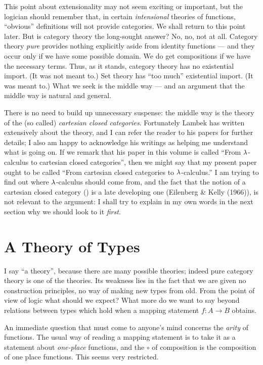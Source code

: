 This point about extensionality may not seem exciting or important, but the logician
should remember that, in certain {\it intensional} theories of functions, ``obvious''
definitions will not provide categories. We shall return to this point later. But is
category theory the long-sought answer? No, no, not at all. Category theory {\it pure}
provides nothing explicitly aside from identity functions --- and they occur only if we
have some possible domain. We do get compositions if we have the necessary terms. Thus, as
it stands, category theory has no existential import. (It was not meant to.) Set theory
has ``too much'' existential import. (It was meant to.) What we seek is the middle way ---
and an argument that the middle way is natural and general.

There is no need to build up unnecessary suspense: the middle way is the theory of the (so
called) {\it cartesian closed categories}. Fortunately Lambek has written extensively
about the theory, and I can refer the reader to his papers for further details; I also am
happy to acknowledge his writings as helping me understand what is going on. If we remark
that his paper in this volume is called ``From $\lambda$-calculus to cartesian closed
categories'', then we might say that my present paper ought to be called ``From cartesian
closed categories to $\lambda$-calculus.'' I am trying to find out where $\lambda$-calculus should
come from, and the fact that the notion of a cartesian closed category (\ccc) is a late
developing one (Eilenberg \& Kelly (1966)), is not relevant to the argument: I shall try
to explain in my own words in the next section why we should look to it {\it first}.

\section{A Theory of Types}

I say ``a theory'', because there are many possible theories; indeed pure category theory
is one of the theories. Its weakness lies in the fact that we are given no construction
principles, no way of making new types from old. From the point of view of logic what
should we expect? What more do we want to say beyond relations between types which hold
when a mapping statement $f : A\to B$ obtains.

An immediate question that must come to anyone's mind concerns the {\it arity} of
functions. The usual way of reading a mapping statement is to take it as a statement about
{\it one-place} functions, and the $\circ$ of composition is the composition of one place
functions. This seems very restricted.

